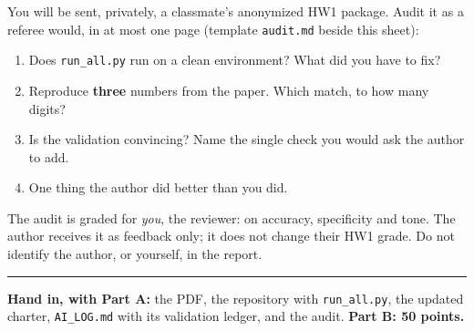 \documentclass[11pt]{article}
\newif\ifsolutions \solutionsfalse
\newcommand{\solution}[1]{\ifsolutions\medskip
  {\color{blue!45!black}\textbf{Solution.} #1}\medskip\fi}
\begin{document}
You will be sent, privately, a classmate's anonymized HW1 package. Audit it as a referee would, in at
most one page (template \texttt{audit.md} beside this sheet):
\begin{enumerate}[label=(\alph*), leftmargin=*]
  \item Does \texttt{run\_all.py} run on a clean environment? What did you have to fix?
  \item Reproduce \textbf{three} numbers from the paper. Which match, to how many digits?
  \item Is the validation convincing? Name the single check you would ask the author to add.
  \item One thing the author did better than you did.
\end{enumerate}
The audit is graded for \emph{you}, the reviewer: on accuracy, specificity and tone. The author
receives it as feedback only; it does not change their HW1 grade. Do not identify the author, or
yourself, in the report.

\solution{\keyDfour}

\vfill
\noindent\rule{\linewidth}{0.4pt}\par
\small
\textbf{Hand in, with Part A:} the PDF, the repository with \texttt{run\_all.py}, the updated charter,
\texttt{AI\_LOG.md} with its validation ledger, and the audit. \textbf{Part B: 50 points.}
\normalsize
\end{document}
